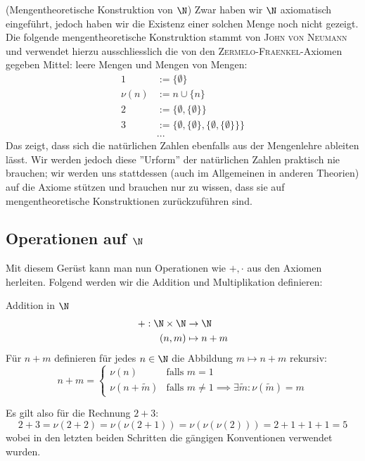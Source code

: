 \begin{remark}(Mengentheoretische Konstruktion von $\N$) Zwar haben wir $\N$ axiomatisch eingeführt, jedoch haben wir die Existenz einer solchen Menge noch nicht gezeigt. Die folgende mengentheoretische Konstruktion stammt von \textsc{John von Neumann} und verwendet hierzu ausschliesslich die von den \textsc{Zermelo-Fraenkel}-Axiomen gegeben Mittel: leere Mengen und Mengen von Mengen:
\begin{align*}
    1 &:= \{\emptyset\}\\
    \nu(n) &:= n \cup \{n\}\\
    2 &:= \{\emptyset, \{\emptyset\}\}\\
    3 &:= \{\emptyset, \{\emptyset\}, \{\emptyset, \{\emptyset\}\}\}\\
    &...
\end{align*}
Das zeigt, dass sich die natürlichen Zahlen ebenfalls aus der Mengenlehre ableiten lässt. Wir werden jedoch diese ''Urform'' der natürlichen Zahlen praktisch nie brauchen; wir werden uns stattdessen (auch im Allgemeinen in anderen Theorien) auf die Axiome stützen und brauchen nur zu wissen, dass sie auf mengentheoretische Konstruktionen zurückzuführen sind.
\end{remark}

\subsection{Operationen auf $\N$}

Mit diesem Gerüst kann man nun Operationen wie $+,\cdot$ aus den Axiomen herleiten. Folgend werden wir die Addition und Multiplikation definieren:

\begin{definition}{Addition in $\N$}{}
\begin{align*}
    +: \N \times \N &\to \N\\
    (n,m) &\mapsto n + m
\end{align*}
Für $n+m$ definieren für jedes $n \in \N$ die Abbildung $m \mapsto n + m$ rekursiv:
$$n + m = \begin{cases}\nu(n)&\text{falls }m = 1 \\ \nu(n + \tilde{m}) & \text{falls } m\neq1 \implies \exists \tilde{m}: \nu(\tilde{m}) = m\end{cases}$$
\end{definition}
\begin{example}[ ] Es gilt also für die Rechnung $2+3$:
$$2 + 3 = \nu(2 + 2) = \nu(\nu(2 + 1)) = \nu(\nu(\nu(2))) = 2 + 1 + 1 + 1 = 5$$
wobei in den letzten beiden Schritten die gängigen Konventionen verwendet wurden.
\end{example}

